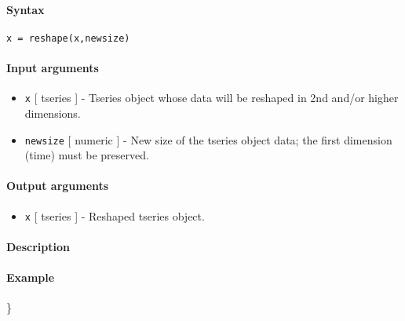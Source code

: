 


	\paragraph{Syntax}\label{syntax}

\begin{verbatim}
x = reshape(x,newsize)
\end{verbatim}

\paragraph{Input arguments}\label{input-arguments}

\begin{itemize}
\item
  \texttt{x} {[} tseries {]} - Tseries object whose data will be
  reshaped in 2nd and/or higher dimensions.
\item
  \texttt{newsize} {[} numeric {]} - New size of the tseries object
  data; the first dimension (time) must be preserved.
\end{itemize}

\paragraph{Output arguments}\label{output-arguments}

\begin{itemize}
\itemsep1pt\parskip0pt
\item
  \texttt{x} {[} tseries {]} - Reshaped tseries object.
\end{itemize}

\paragraph{Description}\label{description}

\paragraph{Example}\label{example}

\}


